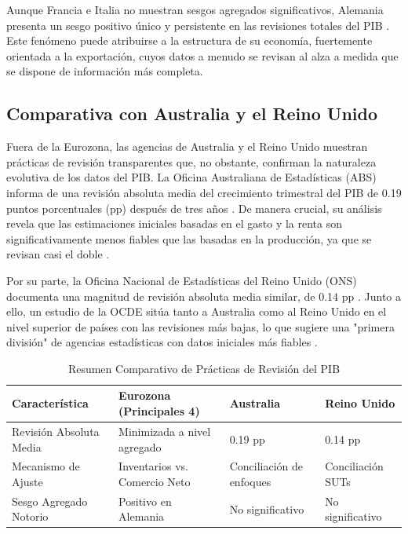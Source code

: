 \documentclass{article}
\begin{document}
Aunque Francia e Italia no muestran sesgos agregados significativos, Alemania presenta un sesgo positivo único y persistente en las revisiones totales del PIB \cite{bce_wp_2857}. Este fenómeno puede atribuirse a la estructura de su economía, fuertemente orientada a la exportación, cuyos datos a menudo se revisan al alza a medida que se dispone de información más completa.

\subsection*{Comparativa con Australia y el Reino Unido}
Fuera de la Eurozona, las agencias de Australia y el Reino Unido muestran prácticas de revisión transparentes que, no obstante, confirman la naturaleza evolutiva de los datos del PIB. La Oficina Australiana de Estadísticas (ABS) informa de una revisión absoluta media del crecimiento trimestral del PIB de 0.19 puntos porcentuales (pp) después de tres años \cite{abs_revisions}. De manera crucial, su análisis revela que las estimaciones iniciales basadas en el gasto y la renta son significativamente menos fiables que las basadas en la producción, ya que se revisan casi el doble \cite{abs_revisions}.

Por su parte, la Oficina Nacional de Estadísticas del Reino Unido (ONS) documenta una magnitud de revisión absoluta media similar, de 0.14 pp \cite{ons_bluebook_2022}. Junto a ello, un estudio de la OCDE sitúa tanto a Australia como al Reino Unido en el nivel superior de países con las revisiones más bajas, lo que sugiere una "primera división" de agencias estadísticas con datos iniciales más fiables \cite{oecd_revisions}.

\begin{table}[h!]
\centering
\caption{Resumen Comparativo de Prácticas de Revisión del PIB}
\label{tab:revision_summary}
\begin{tabular}{llll}
\toprule
\textbf{Característica} & \textbf{Eurozona (Principales 4)} & \textbf{Australia} & \textbf{Reino Unido} \\
\midrule
Revisión Absoluta Media & Minimizada a nivel agregado & 0.19 pp & 0.14 pp \\
Mecanismo de Ajuste & Inventarios vs. Comercio Neto & Conciliación de enfoques & Conciliación SUTs \\
Sesgo Agregado Notorio & Positivo en Alemania & No significativo & No significativo \\
\bottomrule
\end{tabular}
\end{table}
\end{document}
